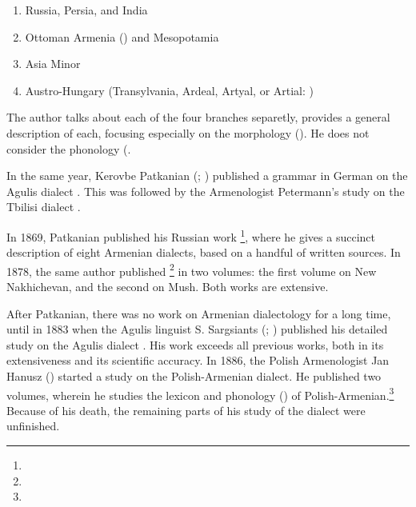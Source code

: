 \begin{adjarianpage}\label{page:2}\end{adjarianpage}%

\begin{enumerate}[noitemsep]
	\item Russia, Persia, and India
	\item Ottoman Armenia () and Mesopotamia
	\item Asia Minor
	\item Austro-Hungary (Transylvania, Ardeal, Artyal,  or Artial: )
	
\end{enumerate}

The author talks about each of the four branches separetly, provides a general description of each, focusing especially on the morphology (). He does not consider the phonology (. 

In the same year, Kerovbe Patkanian (; ) published a grammar in German on the Agulis dialect \citep{Patkanoff-1866-Agulis}. This was followed by the Armenologist Petermann's study on the Tbilisi dialect \citep{Petermann-1867-Tiflis}.

In 1869, Patkanian published his Russian work \citep{Patkanian-1869-RussianDialects}\footnote{}, where he gives a succinct description of eight Armenian dialects, based on a handful of written sources. In   1878,  the same author  published \citet{Patkanian-1875-RussianDialects}\footnote{} in two volumes: the first volume on New Nakhichevan, and the second on Mush. Both works are extensive.

After Patkanian, there was no work on Armenian dialectology for a long time, until in 1883 when the Agulis linguist S. Sargsiants (; ) published his detailed study on the Agulis dialect \citep{Sargiants-1883-Agulis}. His work exceeds all previous works, both in its extensiveness and its scientific accuracy. In 1886, the Polish Armenologist Jan Hanusz () started a study on the Polish-Armenian dialect. He published two volumes, wherein he studies the lexicon and phonology () of Polish-Armenian.\footnote{} Because of his death, the remaining parts of his study of the dialect were unfinished. 

